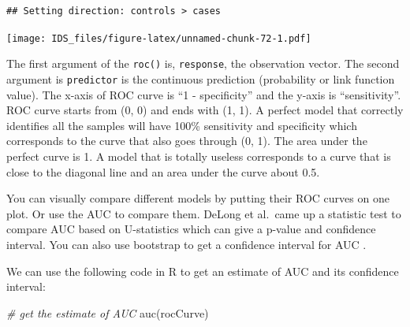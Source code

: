 \documentclass[
  12pt,
]{krantz}
\makeatletter
\newenvironment{Shaded}{\begin{snugshade}}{\end{snugshade}}
\newcommand{\AttributeTok}[1]{\textcolor[rgb]{0.61,0.61,0.61}{#1}}
\newcommand{\CommentTok}[1]{\textcolor[rgb]{0.37,0.37,0.37}{\textit{#1}}}
\newcommand{\DecValTok}[1]{\textcolor[rgb]{0.06,0.06,0.06}{#1}}
\newcommand{\FunctionTok}[1]{\textcolor[rgb]{0,0,0}{#1}}
\newcommand{\NormalTok}[1]{#1}
\newcommand{\SpecialCharTok}[1]{\textcolor[rgb]{0,0,0}{#1}}
\newcommand{\StringTok}[1]{\textcolor[rgb]{0.5,0.5,0.5}{#1}}
\newenvironment{kframe}{%
\medskip{}
\setlength{\fboxsep}{.8em}
 \def\at@end@of@kframe{}%
 \ifinner\ifhmode%
  \def\at@end@of@kframe{\end{minipage}}%
  \begin{minipage}{\columnwidth}%
 \fi\fi%
 \def\FrameCommand##1{\hskip\@totalleftmargin \hskip-\fboxsep
 \colorbox{shadecolor}{##1}\hskip-\fboxsep
     \hskip-\linewidth \hskip-\@totalleftmargin \hskip\columnwidth}%
 \MakeFramed {\advance\hsize-\width
   \@totalleftmargin\z@ \linewidth\hsize
   \@setminipage}}%
 {\par\unskip\endMakeFramed%
 \at@end@of@kframe}
\renewenvironment{Shaded}{\begin{kframe}}{\end{kframe}}
\makeatother
\begin{document}
\begin{verbatim}
## Setting direction: controls > cases
\end{verbatim}

\begin{Shaded}
\end{Shaded}

\texttt{[image: IDS\_files/figure-latex/unnamed-chunk-72-1.pdf]}

The first argument of the \texttt{roc()} is, \texttt{response}, the observation vector. The second argument is \texttt{predictor} is the continuous prediction (probability or link function value). The x-axis of ROC curve is ``1 - specificity'' and the y-axis is ``sensitivity''. ROC curve starts from (0, 0) and ends with (1, 1). A perfect model that correctly identifies all the samples will have 100\% sensitivity and specificity which corresponds to the curve that also goes through (0, 1). The area under the perfect curve is 1. A model that is totally useless corresponds to a curve that is close to the diagonal line and an area under the curve about 0.5.

You can visually compare different models by putting their ROC curves on one plot. Or use the AUC to compare them. DeLong et al.~came up a statistic test to compare AUC based on U-statistics \citep{delong1988} which can give a p-value and confidence interval. You can also use bootstrap to get a confidence interval for AUC \citep{hall2004}.

We can use the following code in R to get an estimate of AUC and its confidence interval:

\begin{Shaded}
\begin{Highlighting}[]
\CommentTok{\# get the estimate of AUC}
\FunctionTok{auc}\NormalTok{(rocCurve)}
\end{Highlighting}
\end{Shaded}
\end{document}
